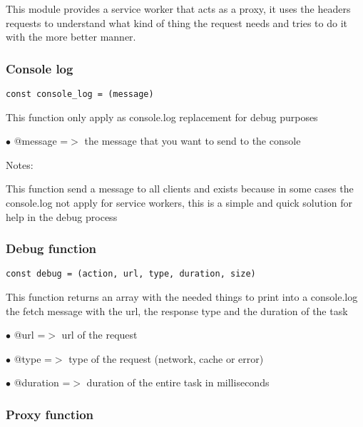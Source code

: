 \documentclass[a4paper]{article}
\begin{document}
This module provides a service worker that acts as a proxy, it uses the headers
requests to understand what kind of thing the request needs and tries to do
it with the more better manner.

\hypertarget{toc820}{}
\subsubsection{Console log}

\begin{lstlisting}
const console_log = (message)
\end{lstlisting}

This function only apply as console.log replacement for debug purposes

\begin{compactitem}
\item[\color{myblue}$\bullet$] @message =$>$ the message that you want to send to the console
\end{compactitem}

Notes:

This function send a message to all clients and exists because in some cases
the console.log not apply for service workers, this is a simple and quick
solution for help in the debug process

\hypertarget{toc821}{}
\subsubsection{Debug function}

\begin{lstlisting}
const debug = (action, url, type, duration, size)
\end{lstlisting}

This function returns an array with the needed things to print into a console.log
the fetch message with the url, the response type and the duration of the task

\begin{compactitem}
\item[\color{myblue}$\bullet$] @url      =$>$ url of the request
\item[\color{myblue}$\bullet$] @type     =$>$ type of the request (network, cache or error)
\item[\color{myblue}$\bullet$] @duration =$>$ duration of the entire task in milliseconds
\end{compactitem}

\hypertarget{toc822}{}
\subsubsection{Proxy function}
\end{document}

